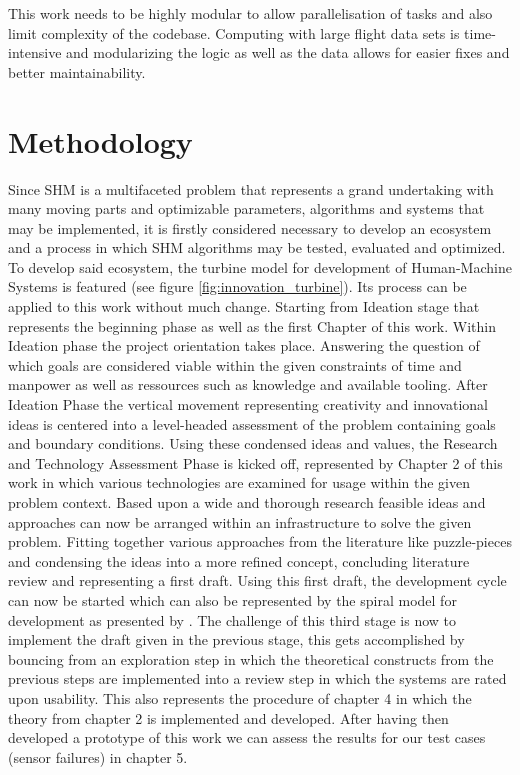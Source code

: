This work needs to be highly modular to allow parallelisation of tasks and also limit complexity of the codebase. Computing with large flight data sets is time-intensive and modularizing the logic as well as the data allows for easier fixes and better maintainability.

\section{Methodology}

Since SHM is a multifaceted problem that represents a grand undertaking with many moving parts and optimizable parameters, algorithms and systems that may be implemented, it is firstly considered necessary to develop an ecosystem and a process in which SHM algorithms may be tested, evaluated and optimized. To develop said ecosystem, the turbine model for development of Human-Machine Systems is featured (see figure \ref{fig:innovation_turbine}). Its process can be applied to this work without much change. Starting from Ideation stage that represents the beginning phase as well as the first Chapter of this work. Within Ideation phase the project orientation takes place. Answering the question of which goals are considered viable within the given constraints of time and manpower as well as ressources such as knowledge and available tooling.
After Ideation Phase the vertical movement representing creativity and innovational ideas is centered into a level-headed assessment of the problem containing goals and boundary conditions. Using these condensed ideas and values, the Research and Technology Assessment Phase is kicked off, represented by Chapter 2 of this work in which various technologies are examined for usage within the given problem context. Based upon a wide and thorough research feasible ideas and approaches can now be arranged within an infrastructure to solve the given problem. Fitting together various approaches from the literature like puzzle-pieces and condensing the ideas into a more refined concept, concluding literature review and representing a first draft. Using this first draft, the development cycle can now be started which can also be represented by the spiral model for development as presented by \textcite{boehm_spiral_1986}. The challenge of this third stage is now to implement the draft given in the previous stage, this gets accomplished by bouncing from an exploration step in which the theoretical constructs from the previous steps are implemented into a review step in which the systems are rated upon usability. This also represents the procedure of chapter 4 in which the theory from chapter 2 is implemented and developed. After having then developed a prototype of this work we can assess the results for our test cases (sensor failures) in chapter 5.




